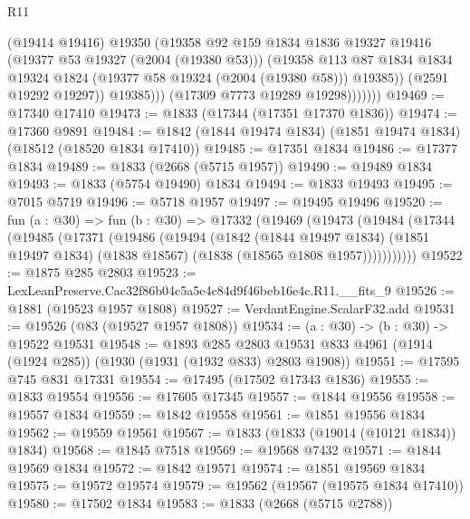 \begin{lexlean}{R11}
\begin{coremodule}
                        (@19414 @19416)
                        @19350
                        (@19358
                          @92
                          @159
                          @1834
                          @1836
                          @19327
                          @19416
                          (@19377 @53 @19327 (@2004 (@19380 @53)))
                          (@19358
                            @113
                            @87
                            @1834
                            @1834
                            @19324
                            @1824
                            (@19377 @58 @19324 (@2004 (@19380 @58)))
                            @19385))
                        (@2591 @19292 @19297))
                      @19385)))
                (@17309 @7773 @19289 @19298)))))))
@19469 := @17340 @17410
@19473 := @1833 (@17344 (@17351 @17370 @1836))
@19474 := @17360 @9891
@19484 := @1842 (@1844 @19474 @1834) (@1851 @19474 @1834) (@18512 (@18520 @1834 @17410))
@19485 := @17351 @1834
@19486 := @17377 @1834
@19489 := @1833 (@2668 (@5715 @1957))
@19490 := @19489 @1834
@19493 := @1833 (@5754 @19490) @1834
@19494 := @1833 @19493
@19495 := @7015 @5719
@19496 := @5718 @1957
@19497 := @19495 @19496
@19520 := fun (a : @30) =>
  fun (b : @30) =>
  @17332
    (@19469
      (@19473
        (@19484
          (@17344
            (@19485
              (@17371
                (@19486
                  (@19494
                    (@1842
                      (@1844 @19497 @1834)
                      (@1851 @19497 @1834)
                      (@1838 @18567)
                      (@1838 (@18565 @1808 @1957)))))))))))
@19522 := @1875 @285 @2803
@19523 := LexLeanPreserve.Cac32f86b04c5a5e4c84d9f46beb16e4c.R11.__fits_9
@19526 := @1881 (@19523 @1957 @1808)
@19527 := VerdantEngine.ScalarF32.add
@19531 := @19526 (@83 (@19527 @1957 @1808))
@19534 := (a : @30) -> (b : @30) -> @19522 @19531
@19548 := @1893
    @285
    @2803
    @19531
    @833
    @4961
    (@1914 (@1924 @285))
    (@1930 (@1931 (@1932 @833) @2803 @1908))
@19551 := @17595 @745 @831 @17331
@19554 := @17495 (@17502 @17343 @1836)
@19555 := @1833 @19554
@19556 := @17605 @17345
@19557 := @1844 @19556
@19558 := @19557 @1834
@19559 := @1842 @19558
@19561 := @1851 @19556 @1834
@19562 := @19559 @19561
@19567 := @1833 (@1833 (@19014 (@10121 @1834)) @1834)
@19568 := @1845 @7518
@19569 := @19568 @7432
@19571 := @1844 @19569 @1834
@19572 := @1842 @19571
@19574 := @1851 @19569 @1834
@19575 := @19572 @19574
@19579 := @19562 (@19567 (@19575 @1834 @17410))
@19580 := @17502 @1834
@19583 := @1833 (@2668 (@5715 @2788))

\end{coremodule}
\end{lexlean}

